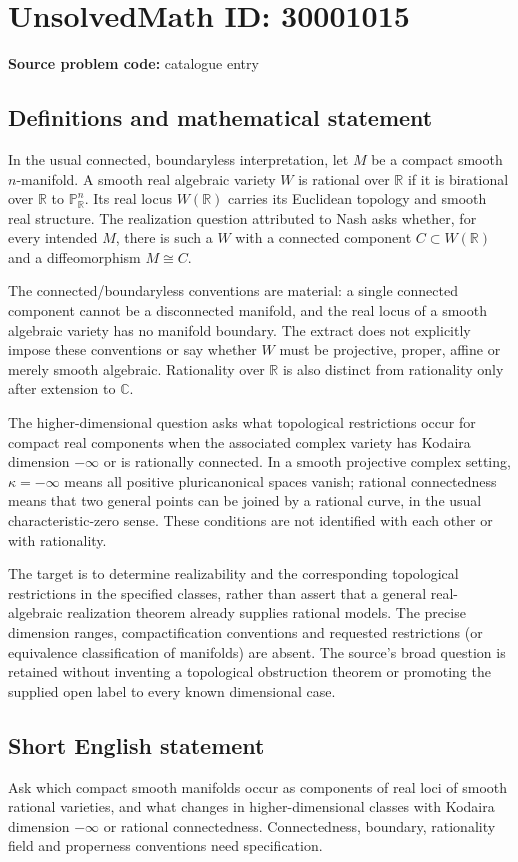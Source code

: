 \documentclass[11pt]{article}
\newcommand{\R}{\mathbb{R}}
\newcommand{\C}{\mathbb{C}}
\newcommand{\PP}{\mathbb{P}}
\begin{document}
\section*{UnsolvedMath ID: 30001015}
\textbf{Source problem code:} catalogue entry
\subsection{Definitions and mathematical statement}
In the usual connected, boundaryless interpretation, let $M$ be a compact smooth $n$-manifold. A smooth real algebraic variety $W$ is rational over $\R$ if it is birational over $\R$ to $\PP^n_{\R}$. Its real locus $W(\R)$ carries its Euclidean topology and smooth real structure. The realization question attributed to Nash asks whether, for every intended $M$, there is such a $W$ with a connected component $C\subset W(\R)$ and a diffeomorphism $M\cong C$.

The connected/boundaryless conventions are material: a single connected component cannot be a disconnected manifold, and the real locus of a smooth algebraic variety has no manifold boundary. The extract does not explicitly impose these conventions or say whether $W$ must be projective, proper, affine or merely smooth algebraic. Rationality over $\R$ is also distinct from rationality only after extension to $\C$.

The higher-dimensional question asks what topological restrictions occur for compact real components when the associated complex variety has Kodaira dimension $-\infty$ or is rationally connected. In a smooth projective complex setting, $\kappa=-\infty$ means all positive pluricanonical spaces vanish; rational connectedness means that two general points can be joined by a rational curve, in the usual characteristic-zero sense. These conditions are not identified with each other or with rationality.

The target is to determine realizability and the corresponding topological restrictions in the specified classes, rather than assert that a general real-algebraic realization theorem already supplies rational models. The precise dimension ranges, compactification conventions and requested restrictions (or equivalence classification of manifolds) are absent. The source's broad question is retained without inventing a topological obstruction theorem or promoting the supplied open label to every known dimensional case.
\subsection{Short English statement}
Ask which compact smooth manifolds occur as components of real loci of smooth rational varieties, and what changes in higher-dimensional classes with Kodaira dimension $-\infty$ or rational connectedness. Connectedness, boundary, rationality field and properness conventions need specification.
\end{document}
